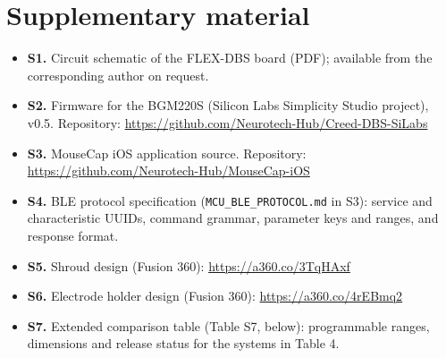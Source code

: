 \section{Supplementary material}\label{supplementary-material}

\begin{itemize}
\item \textbf{S1.} Circuit schematic of the FLEX-DBS board (PDF); available from the corresponding author on request.
\item \textbf{S2.} Firmware for the BGM220S (Silicon Labs Simplicity Studio project), v0.5. Repository: \url{https://github.com/Neurotech-Hub/Creed-DBS-SiLabs}
\item \textbf{S3.} MouseCap iOS application source. Repository: \url{https://github.com/Neurotech-Hub/MouseCap-iOS}
\item \textbf{S4.} BLE protocol specification (\texttt{MCU\_BLE\_PROTOCOL.md} in S3): service and characteristic UUIDs, command grammar, parameter keys and ranges, and response format.
\item \textbf{S5.} Shroud design (Fusion 360): \url{https://a360.co/3TqHAxf}
\item \textbf{S6.} Electrode holder design (Fusion 360): \url{https://a360.co/4rEBmq2}
\item \textbf{S7.} Extended comparison table (Table S7, below): programmable ranges, dimensions and release status for the systems in Table 4.
\end{itemize}

